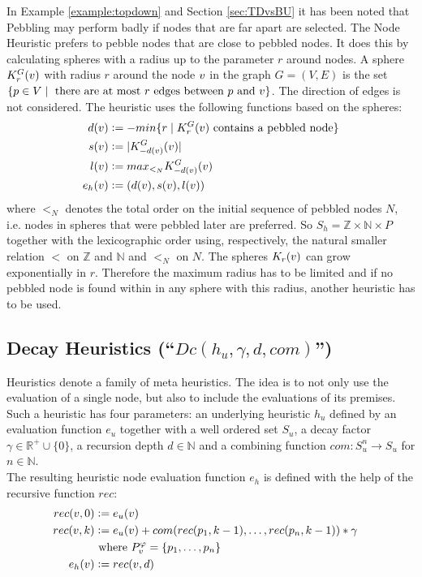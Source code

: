 \documentclass{llncs}
\newcommand{\defeq}{\mathrel{\mathop:}=}
\newcommand{\Premises}[2]{P_{#1}^{#2}}
\begin{document}
In Example \ref{example:topdown} and Section \ref{sec:TDvsBU} it has been noted that  Pebbling may perform badly if nodes that are far apart are selected. The Node  Heuristic prefers to pebble nodes that are close to pebbled nodes. It does this by calculating spheres with a radius up to the parameter $r$ around nodes.
A sphere $K_r^{G}(v)$ with radius $r$ around the node $v$ in the graph $G = (V,E)$ is the set $\{p \in V \mid \text{ there are at most } r \text{ edges between } p \text{ and } v\}$. The direction of edges is not considered. The heuristic uses the following functions based on the spheres:
\begin{align*}
d(\n) &\defeq -min\{r \mid K_r^{G}(\n)\text{ contains a pebbled node}\}\\
	s(\n) &\defeq |K_{-d(\n)}^G(\n)|\\
	l(\n) &\defeq max_{<_N}K_{-d(\n)}^G(\n)\\
	e_h(\n) &\defeq (d(\n),s(\n),l(\n))
\end{align*}
where $<_N$ denotes the total order on the initial sequence of pebbled nodes $N$, i.e. nodes in spheres that were pebbled later are preferred.
So $S_h = \mathbb{Z} \times \mathbb{N} \times P$ together with the lexicographic order using, respectively, the natural smaller relation $<$ on $\mathbb{Z}$ and $\mathbb{N}$ and $<_N$ on $N$. The spheres $K_r(v)$ can grow exponentially in $r$. Therefore the maximum radius has to be limited and if no pebbled node is found within in any sphere with this radius, another heuristic has to be used.


\subsection{Decay Heuristics (``$Dc(h_u,\gamma,d,com)$'') }
\label{sec:decay}
 Heuristics denote a family of meta heuristics. 
The idea is to not only use the evaluation of a single node, but also to include the evaluations of its premises.
Such a heuristic has four parameters: an underlying heuristic $h_u$ defined by an evaluation function $e_u$ together with a well ordered set $S_u$, a decay factor $\gamma \in \mathbb{R}^+ \cup \{0\}$, a recursion depth $d \in \mathbb{N}$ and a combining function $com: S_u^n \rightarrow S_u$ for $n \in \mathbb{N}$.\\
The resulting heuristic node evaluation function $e_h$ is defined with the help of the recursive function $rec$:
\begin{align*}
	rec(\n,0) &\defeq e_u(\n) \\
	rec(\n,k) &\defeq e_u(\n) + com(rec(p_1,k-1),\ldots,rec(p_n,k-1)) * \gamma\\
	& \text{ where } \Premises{\n}{\varphi} = \{p_1,\ldots,p_n\}\\
	e_h(\n) &\defeq rec(\n,d) &
\end{align*}
\end{document}
